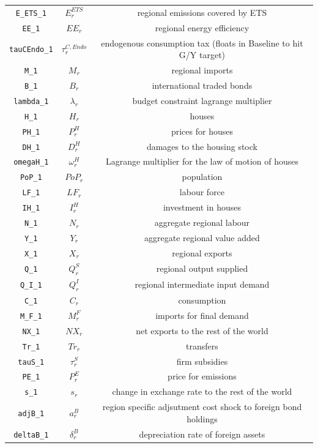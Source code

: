 \begin{center}
\begin{longtable}{ccc}
\texttt{E\_ETS\_1} & ${E^{ETS}_r}$ & regional emissions covered by ETS\\
\texttt{EE\_1} & ${EE_r}$ & regional energy efficiency\\
\texttt{tauCEndo\_1} & ${\tau^{C,Endo}_{r}}$ & endogenous consumption tax (floats in Baseline to hit G/Y target)\\
\texttt{M\_1} & ${M_{r}}$ & regional imports\\
\texttt{B\_1} & ${B_r}$ & international traded bonds\\
\texttt{lambda\_1} & $\lambda_r$ & budget constraint lagrange multiplier\\
\texttt{H\_1} & ${H_r}$ & houses\\
\texttt{PH\_1} & ${P^H_r}$ & prices for houses\\
\texttt{DH\_1} & ${D^H_r}$ & damages to the housing stock\\
\texttt{omegaH\_1} & ${\omega^H_r}$ & Lagrange multiplier for the law of motion of houses\\
\texttt{PoP\_1} & ${PoP_r}$ & population\\
\texttt{LF\_1} & ${LF_r}$ & labour force\\
\texttt{IH\_1} & ${I^H_r}$ & investment in houses\\
\texttt{N\_1} & ${N_r}$ & aggregate regional labour\\
\texttt{Y\_1} & ${Y_r}$ & aggregate regional value added\\
\texttt{X\_1} & ${X_r}$ & regional exports\\
\texttt{Q\_1} & ${Q^S_r}$ & regional output supplied\\
\texttt{Q\_I\_1} & ${Q^I_r}$ & regional intermediate input demand\\
\texttt{C\_1} & ${C_r}$ & consumption\\
\texttt{M\_F\_1} & ${M^F_r}$ & imports for final demand\\
\texttt{NX\_1} & ${NX_r}$ & net exports to the rest of the world\\
\texttt{Tr\_1} & ${Tr_r}$ & transfers\\
\texttt{tauS\_1} & ${\tau^{S}_{r}}$ & firm subsidies\\
\texttt{PE\_1} & ${P^E_r}$ & price for emissions\\
\texttt{s\_1} & ${s_r}$ & change in exchange rate to the rest of the world\\
\texttt{adjB\_1} & $a^B_r$ & region specific adjsutment cost shock to foreign bond holdings\\
\texttt{deltaB\_1} & ${\delta^{B}_r}$ & depreciation rate of foreign assets\\

\end{longtable}
\end{center}

